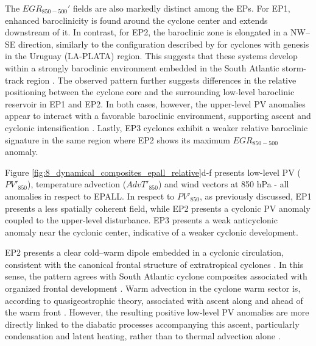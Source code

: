 \documentclass[pdflatex,sn-chicago]{sn-jnl}%
\theoremstyle{plain}
\theoremstyle{definition}
\theoremstyle{remark}
\theoremstyle{definition}
\begin{document}
The $EGR_{850-500}'$ fields are also markedly distinct among the EPs. For EP1, enhanced baroclinicity is found around the cyclone center and extends downstream of it. In contrast, for EP2, the baroclinic zone is elongated in a NW--SE direction, similarly to the configuration described by \citet{crespo2021potential} for cyclones with genesis in the Uruguay (LA-PLATA) region. This suggests that these systems develop within a strongly baroclinic environment embedded in the South Atlantic storm-track region \citep{hoskins1990existence,chang2002storm,hoskins2005new}. The observed pattern further suggests differences in the relative positioning between the cyclone core and the surrounding low-level baroclinic reservoir in EP1 and EP2. In both cases, however, the upper-level PV anomalies appear to interact with a favorable baroclinic environment, supporting ascent and cyclonic intensification \citep{davis1991potential,huo1999interaction,besson2021global,crespo2021potential}. Lastly, EP3 cyclones exhibit a weaker relative baroclinic signature in the same region where EP2 shows its maximum $EGR_{850-500}$ anomaly.
 

Figure \ref{fig:8_dynamical_composites_epall_relative}d-f presents low-level PV ($PV'_{850}$), temperature advection ($AdvT'_{850}$) and wind vectors at 850 hPa - all anomalies in respect to EPALL. In respect to $PV'_{850}$, as previously discussed, EP1 presents a less spatially coherent field, while EP2 presents a cyclonic PV anomaly coupled to the upper-level disturbance. EP3 presents a weak anticyclonic anomaly near the cyclonic center, indicative of a weaker cyclonic development.

EP2 presents a clear cold--warm dipole embedded in a cyclonic circulation, consistent with the canonical frontal structure of extratropical cyclones \citep[e.g.][]{dacre2012extratropical}. In this sense, the pattern agrees with South Atlantic cyclone composites associated with organized frontal development \citep{gramcianinov2019properties}. Warm advection in the cyclone warm sector is, according to quasigeostrophic theory, associated with ascent along and ahead of the warm front \citep{davies2015quasigeostrophic}. However, the resulting positive low-level PV anomalies are more directly linked to the diabatic processes accompanying this ascent, particularly condensation and latent heating, rather than to thermal advection alone \citep{hoskins1985use,huo1999interaction,attinger2021systematic}.
\end{document}
